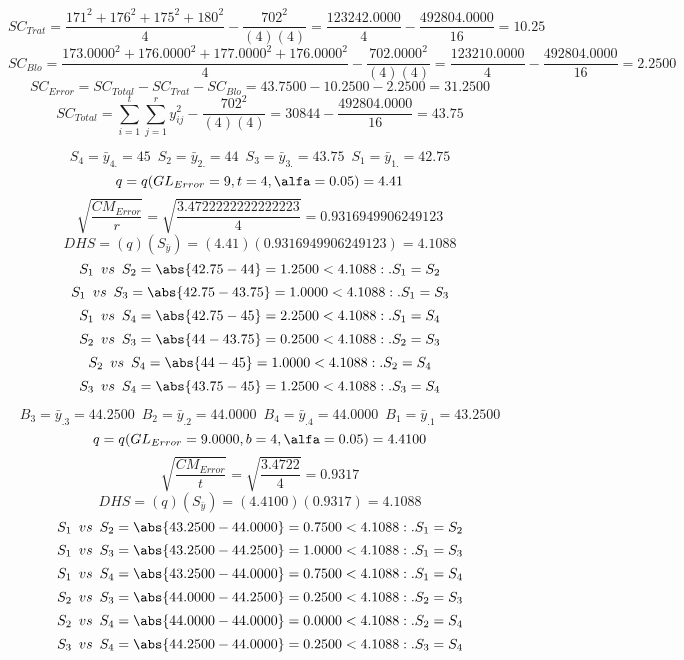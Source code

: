 $$SC_{Trat}=\frac{171^{2}+176^{2}+175^{2}+180^{2}}{4}-\frac{702^{2}}{(4)(4)}=\frac{123242.0000}{4}-\frac{492804.0000}{16}=10.25$$
$$SC_{Blo}=\frac{173.0000^{2}+176.0000^{2}+177.0000^{2}+176.0000^{2}}{4}-\frac{702.0000^{2}}{(4)(4)}=\frac{123210.0000}{4}-\frac{492804.0000}{16}=2.2500$$
$$SC_{Error}=SC_{Total}-SC_{Trat}-SC_{Blo}=43.7500-10.2500-2.2500=31.2500$$
$$SC_{Total}=\sum_{i=1}^{\mathit{t}}\sum_{j=1}^{\mathit{r}}y_{ij}^{2}-\frac{702^{2}}{(4)(4)}=30844-\frac{492804.0000}{16}=43.75$$

$$S_{4}=\bar{y}_{4.}=45 \enspace S_{2}=\bar{y}_{2.}=44 \enspace S_{3}=\bar{y}_{3.}=43.75 \enspace S_{1}=\bar{y}_{1.}=42.75$$
$$q=q(GL_{Error}=9, t=4, \alfa=0.05)=4.41$$
$$\sqrt{\frac{CM_{Error}}{r}}=\sqrt{\frac{3.4722222222222223}{4}}=0.9316949906249123$$
$$DHS=(q)(S_{\bar{y}})=(4.41)(0.9316949906249123)=4.1088$$
$$S_{1} \enspace vs \enspace S_{2} = \abs{42.75-44}=1.2500<4.1088:.S_{1}=S_{2}$$
$$S_{1} \enspace vs \enspace S_{3} = \abs{42.75-43.75}=1.0000<4.1088:.S_{1}=S_{3}$$
$$S_{1} \enspace vs \enspace S_{4} = \abs{42.75-45}=2.2500<4.1088:.S_{1}=S_{4}$$
$$S_{2} \enspace vs \enspace S_{3} = \abs{44-43.75}=0.2500<4.1088:.S_{2}=S_{3}$$
$$S_{2} \enspace vs \enspace S_{4} = \abs{44-45}=1.0000<4.1088:.S_{2}=S_{4}$$
$$S_{3} \enspace vs \enspace S_{4} = \abs{43.75-45}=1.2500<4.1088:.S_{3}=S_{4}$$


$$B_{3}=\bar{y}_{.3}=44.2500 \enspace B_{2}=\bar{y}_{.2}=44.0000 \enspace B_{4}=\bar{y}_{.4}=44.0000 \enspace B_{1}=\bar{y}_{.1}=43.2500$$
$$q=q(GL_{Error}=9.0000, b=4, \alfa=0.05)=4.4100$$
$$\sqrt{\frac{CM_{Error}}{t}}=\sqrt{\frac{3.4722}{4}}=0.9317$$
$$DHS=(q)(S_{\bar{y}})=(4.4100)(0.9317)=4.1088$$
$$S_{1} \enspace vs \enspace S_{2} = \abs{43.2500-44.0000}=0.7500<4.1088:.S_{1}=S_{2}$$
$$S_{1} \enspace vs \enspace S_{3} = \abs{43.2500-44.2500}=1.0000<4.1088:.S_{1}=S_{3}$$
$$S_{1} \enspace vs \enspace S_{4} = \abs{43.2500-44.0000}=0.7500<4.1088:.S_{1}=S_{4}$$
$$S_{2} \enspace vs \enspace S_{3} = \abs{44.0000-44.2500}=0.2500<4.1088:.S_{2}=S_{3}$$
$$S_{2} \enspace vs \enspace S_{4} = \abs{44.0000-44.0000}=0.0000<4.1088:.S_{2}=S_{4}$$
$$S_{3} \enspace vs \enspace S_{4} = \abs{44.2500-44.0000}=0.2500<4.1088:.S_{3}=S_{4}$$




